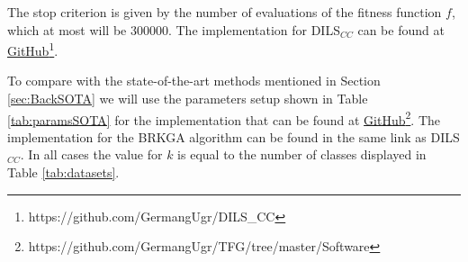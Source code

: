 \documentclass[review]{elsarticle}
\begin{document}
The stop criterion is given by the number of evaluations of the fitness function $f$, which at most will be 300000. The implementation for DILS$_{CC}$ can be found at \href{https://github.com/GermangUgr/DILS_CC}{GitHub}\footnote{https://github.com/GermangUgr/DILS\_CC}.

To compare with the state-of-the-art methods mentioned in Section \ref{sec:BackSOTA} we will use the parameters setup shown in Table \ref{tab:paramsSOTA} for the implementation that can be found at \href{https://github.com/GermangUgr/TFG/tree/master/Software}{GitHub}\footnote{https://github.com/GermangUgr/TFG/tree/master/Software}. The implementation for the BRKGA algorithm can be found in the same link as DILS$_{CC}$. In all cases the value for $k$ is equal to the number of classes displayed in Table \ref{tab:datasets}.

\begin{table}[!h]
	\centering
	\setlength{\tabcolsep}{7pt}
	\renewcommand{\arraystretch}{1.4}
		
	\caption{Parameters setup used for the state-of-the-art algorithms.}
	\label{tab:paramsSOTA}
\end{table}
\end{document}
